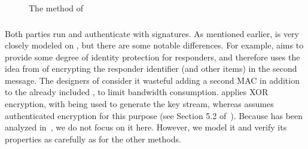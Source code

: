 \begin{figure}[h]
{}
\caption{The \mStatSig{} method of \mEdhoc}
\label{fig:edhocstatsig}
\end{figure}

\spacehack
\subsubsection{\mSigSig{}}
Both parties run \mSig{} and authenticate with signatures.
%
As mentioned earlier, \mSigSig{} is very closely modeled on \mSigmaI{}, but there are some notable differences.
%
For example, \mEdhoc{} aims to provide some degree of identity protection for responders, and therefore uses the idea from \mSigmaI{} of encrypting the responder identifier \mIdcredr{} (and other items) in the second message.
%
The designers of \mEdhoc{} consider it wasteful adding a second MAC in addition to the already included \mMactwo{}, to limit bandwidth consumption.
%
\mEdhoc{} applies XOR encryption, with \mHkdf{} being used to generate the key stream, whereas \mSigma{} assumes authenticated encryption for this purpose (see Section 5.2 of~\cite{sigma}). 
%
Because \mSigSig{} has been analyzed in~\cite{DBLP:conf/secsr/BruniJPS18}, we do not focus on it here. However, we model it and verify its properties as carefully as for the other methods.


